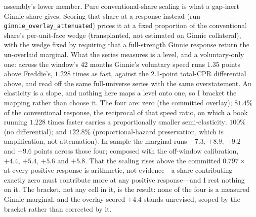 \documentclass[12pt]{article}
\begin{document}
assembly's lower member. Pure conventional-share scaling is what a gap-inert Ginnie share gives. Scoring that share at a response instead (run \texttt{ginnie\_overlay\_attenuated}) prices it at a fixed proportion of the conventional share's per-unit-face wedge (transplanted, not estimated on Ginnie collateral), with the wedge fixed by requiring that a full-strength Ginnie response return the un-overlaid marginal. What the series measures is a level, and a voluntary-only one: across the window's 42 months Ginnie's voluntary speed runs $1.35$ points above Freddie's, $1.228$ times as fast, against the 2.1-point total-CPR differential above, and read off the same full-universe series with the same overstatement. An elasticity is a slope, and nothing here maps a level onto one, so I bracket the mapping rather than choose it. The four are: zero (the committed overlay); $81.4$\% of the conventional response, the reciprocal of that speed ratio, on which a book running $1.228$ times faster carries a proportionally smaller semi-elasticity; $100$\% (no differential); and $122.8$\% (proportional-hazard preservation, which is amplification, not attenuation). In-sample the marginal runs $+7.3$, $+8.9$, $+9.2$ and $+9.6$ points across those four; composed with the off-window calibration, $+4.4$, $+5.4$, $+5.6$ and $+5.8$. That the scaling rises above the committed $0.797\times$ at every positive response is arithmetic, not evidence---a share contributing exactly zero must contribute more at any positive response---and I rest nothing on it. The bracket, not any cell in it, is the result: none of the four is a measured Ginnie marginal, and the overlay-scored $+4.4$ stands unrevised, scoped by the bracket rather than corrected by it.
\end{document}
